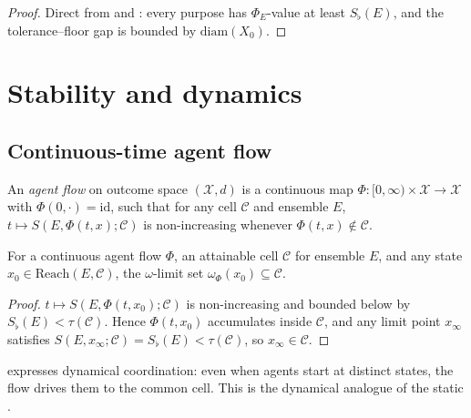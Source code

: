 \documentclass[11pt,twocolumn,a4paper]{article}
\newcommand{\X}{\mathcal{X}}
\newcommand{\Cell}{\mathcal{C}}
\newcommand{\Sfloor}{S_{\flat}}
\newcommand{\diam}{\mathrm{diam}}
\newcommand{\id}{\mathrm{id}}
\newcommand{\Reach}{\mathrm{Reach}}
\begin{document}
\begin{proof}
Direct from  and : every purpose
has $\Phi_E$-value at least $\Sfloor(E)$, and the
tolerance--floor gap is bounded by $\diam(X_0)$.
\end{proof}

\section{Stability and dynamics}
\label{sec:stability}

\subsection{Continuous-time agent flow}

\begin{definition}\label{def:flow}
An \emph{agent flow} on outcome space $(\X,d)$ is a continuous map
$\Phi:[0,\infty)\times\X\to\X$ with $\Phi(0,\cdot)=\id$, such that
for any cell $\Cell$ and ensemble $E$,
$t\mapsto S(E,\Phi(t,x);\Cell)$ is non-increasing whenever
$\Phi(t,x)\notin\Cell$.
\end{definition}

\begin{theorem}\label{thm:omega}
For a continuous agent flow $\Phi$, an attainable cell $\Cell$ for
ensemble $E$, and any state $x_0\in\Reach(E,\Cell)$, the
$\omega$-limit set $\omega_\Phi(x_0)\subseteq\Cell$.
\end{theorem}

\begin{proof}
$t\mapsto S(E,\Phi(t,x_0);\Cell)$ is non-increasing and bounded below
by $\Sfloor(E)<\tau(\Cell)$. Hence $\Phi(t,x_0)$ accumulates inside
$\Cell$, and any limit point $x_\infty$ satisfies
$S(E,x_\infty;\Cell)=\Sfloor(E)<\tau(\Cell)$, so $x_\infty\in\Cell$.
\end{proof}

\begin{remark}\label{rem:dyn-coord}
 expresses dynamical coordination: even when agents
start at distinct states, the flow drives them to the common cell.
This is the dynamical analogue of the static
.
\end{remark}
\end{document}
